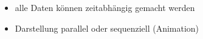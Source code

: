 \begin{itemize}
	\item alle Daten können zeitabhängig gemacht werden
	\item Darstellung parallel oder sequenziell (Animation)
\end{itemize}